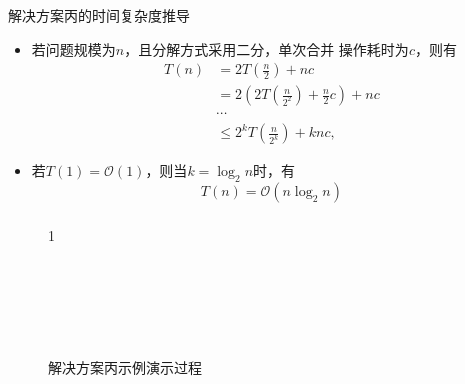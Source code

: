 \begin{fragile}
	\frametitle{\insertsubsectionhead}
	\begin{exampleblock}{解决方案丙的时间复杂度推导}
		\begin{itemize}
			\item 若问题规模为$n$，且\alert{分解}方式采用二分，单次\alert{合并}
			      操作耗时为$c$，则有
			      \begin{align*}
				      T(n) & = 2T\left(\frac{n}{2}\right) + nc                                \\
				           & = 2\left(2T\left(\frac{n}{2^{2}}\right) + \frac{n}{2}c\right)+nc \\
				           & \cdots                                                           \\
				           & \leq 2^{k}T\left(\frac{n}{2^{k}}\right) + knc,
			      \end{align*}
			\item<2-> 若$T(1)=\mathcal{O}(1)$，则当$k=\log_{2}{n}$时，有
			      \[
				      T(n) = \mathcal{O}(n\log_{2}{n})
			      \]
		\end{itemize}
	\end{exampleblock}
\end{fragile}

\begin{fragile}
	\frametitle{\insertsubsectionhead}
	\begin{figure}
		\centering
		\begin{bytefield}{1}
			 \\
			 \\
			\only<9->{\bitbox{3}{$-2$}} \\
			\bitbox[]{3}{} \\
			 \\
			 \\
		\end{bytefield}
		\caption{解决方案丙示例演示过程}
		\label{fig:demo_3}
	\end{figure}
\end{fragile}

